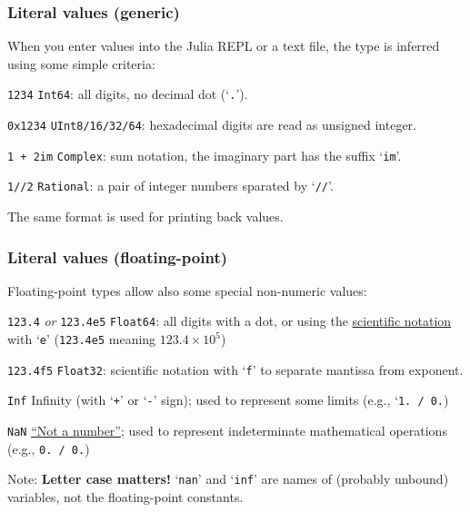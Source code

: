 \documentclass[english,serif,mathserif,xcolor=pdftex,dvipsnames,table]{beamer}
\begin{document}
\begin{frame}
  \frametitle{Literal values (generic)}
  \smaller

  When you enter values into the Julia REPL or a text file, the type
  is inferred using some simple criteria:

  \+
  \begin{describe}{\texttt{1234}}
    \texttt{Int64}: all digits, no decimal dot (`\texttt{.}').
  \end{describe}

  \+
  \begin{describe}{\texttt{0x1234}}
    \texttt{UInt8/16/32/64}: hexadecimal digits are read as unsigned integer.
  \end{describe}

  \+
  \begin{describe}{\texttt{1 + 2im}}
    \texttt{Complex}: sum notation, the imaginary part has the suffix `\texttt{im}'.
  \end{describe}

  \begin{describe}{\texttt{1//2}}
    \texttt{Rational}: a pair of integer numbers sparated by `\texttt{//}'.
  \end{describe}

  \+
  The same format is used for printing back values.
\end{frame}


\begin{frame}
  \frametitle{Literal values (floating-point)}
  \smaller

  Floating-point types allow also some special non-numeric values:

  \+
  \begin{describe}{\texttt{123.4} \emph{or} \texttt{123.4e5}}
    \texttt{Float64}: all digits with a dot, or using the \href{https://en.wikipedia.org/wiki/Scientific_notation}{scientific notation} with `\texttt{e}' (\texttt{123.4e5} meaning $123.4 \times 10^5$)
  \end{describe}

  \begin{describe}{\texttt{123.4f5}}
    \texttt{Float32}: scientific notation with `\texttt{f}' to separate mantissa from exponent.
  \end{describe}

  \+
  \begin{describe}{\texttt{Inf}}
    Infinity (with `\texttt{+}' or `\texttt{-}' sign); used to
    represent some limits (e.g., `\texttt{1. / 0.})
  \end{describe}

  \begin{describe}{\texttt{NaN}}
    \href{https://en.wikipedia.org/wiki/NaN#Floating_point}{``Not a
      number''}; used to represent indeterminate mathematical
    operations (e.g., \texttt{0. / 0.})
  \end{describe}

  \+ Note: \textbf{Letter case matters!} `\texttt{nan}' and
  `\texttt{inf}' are names of (probably unbound) variables, not the
  floating-point constants.
\end{frame}
\end{document}
